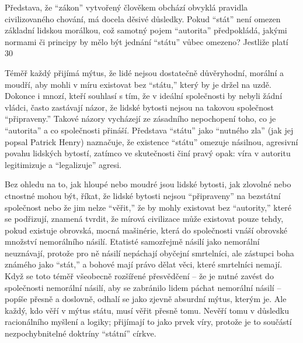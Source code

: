 \documentclass{book}
\begin{document}
Představa, že \enquote{zákon} vytvořený člověkem obchází obvyklá pravidla civilizovaného chování, má docela děsivé důsledky. Pokud \enquote{stát} není omezen základní lidskou morálkou, což samotný pojem \enquote{autorita} předpokládá, jakými normami či principy by mělo být jednání \enquote{státu} vůbec omezeno? Jestliže platí 30%

Téměř každý přijímá mýtus, že lidé nejsou dostatečně důvěryhodní, morální a moudří, aby mohli v míru existovat bez \enquote{státu,} který by je držel na uzdě. Dokonce i mnozí, kteří souhlasí s tím, že v ideální společnosti by nebyli žádní vládci, často zastávají názor, že lidské bytosti nejsou na takovou společnost \enquote{připraveny.} Takové názory vycházejí ze zásadního nepochopení toho, co je \enquote{autorita} a co společnosti přináší. Představa \enquote{státu} jako \enquote{nutného zla} (jak jej popsal Patrick Henry) naznačuje, že existence \enquote{státu} omezuje násilnou, agresivní povahu lidských bytostí, zatímco ve skutečnosti činí pravý opak: víra v autoritu legitimizuje a \enquote{legalizuje} agresi.

Bez ohledu na to, jak hloupé nebo moudré jsou lidské bytosti, jak zlovolné nebo ctnostné mohou být, říkat, že lidské bytosti nejsou \enquote{připraveny} na bezstátní společnost nebo že jim nelze \enquote{věřit,} že by mohly existovat bez \enquote{autority,} které se podřizují, znamená tvrdit, že mírová civilizace může existovat pouze tehdy, pokud existuje obrovská, mocná mašinérie, která do společnosti vnáší obrovské množství nemorálního násilí. Etatisté samozřejmě násilí jako nemorální neuznávají, protože pro ně násilí nepáchají obyčejní smrtelníci, ale zástupci boha známého jako \enquote{stát,} a bohové mají právo dělat věci, které smrtelníci nemají. Když se toto téměř všeobecně rozšířené přesvědčení -- že je nutné zavést do společnosti nemorální násilí, aby se zabránilo lidem páchat nemorální násilí -- popíše přesně a doslovně, odhalí se jako zjevně absurdní mýtus, kterým je. Ale každý, kdo věří v mýtus státu, musí věřit přesně tomu. Nevěří tomu v důsledku racionálního myšlení a logiky; přijímají to jako prvek víry, protože je to součástí nezpochybnitelné doktríny \enquote{státní} církve.
\end{document}
